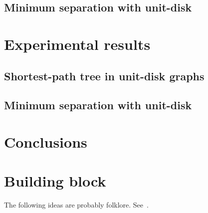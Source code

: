\documentclass[a4paper,USenglish,numberwithinsect]{lipics}
\begin{document}
\subsection{Minimum separation with unit-disk}
\label{sec:implementation-separation}



\section{Experimental results}
\label{sec:experiments}

\subsection{Shortest-path tree in unit-disk graphs}
\label{sec:experiments-sptree}

\subsection{Minimum separation with unit-disk}
\label{sec:experiments-separation}

\section{Conclusions}
\label{sec:conclusions}





\section{Building block}

The following ideas are probably folklore. See~\cite{aa}.
\end{document}
